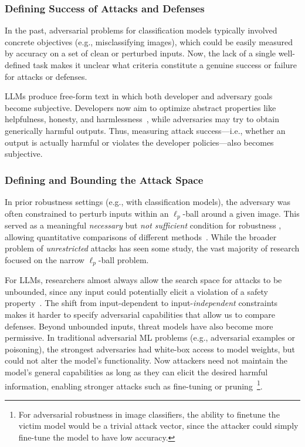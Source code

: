 \subsubsection{Defining Success of Attacks and Defenses}
\label{sssec:success}

In the past, adversarial problems for classification models typically involved concrete objectives (e.g., misclassifying images), which could be easily measured by accuracy on a set of clean or perturbed inputs. Now, the lack of a single well-defined task makes it unclear what criteria constitute a genuine success or failure for attacks or defenses.

LLMs produce free-form text in which both developer and adversary goals become subjective. Developers now aim to optimize abstract properties like helpfulness, honesty, and harmlessness~\citep{bai2022training}, while adversaries may try to obtain generically harmful outputs. Thus, measuring attack success---i.e., whether an output is actually harmful or violates the developer policies---also becomes subjective. %


\subsubsection{Defining and Bounding the Attack Space}
\label{sssec:attackspace}

In prior robustness settings (e.g., with classification models), the adversary was often constrained to perturb inputs within an $\ell_p$-ball around a given image. This served as a meaningful \emph{necessary} but \emph{not sufficient} condition for robustness  \cite{gilmer2018motivating}, allowing quantitative comparisons of different methods~\citep{goodfellow2014explaining}.
While the broader problem of \emph{unrestricted} \cite{brown2018unrestricted,song2018constructing} attacks has seen some study, the vast majority of research focused on the narrow $\ell_p$-ball problem.

For LLMs, researchers almost always allow the search space for attacks to be unbounded, since any input could potentially elicit a violation of a safety property~\citep{wei2024jailbroken}. The shift from input-dependent to input-\emph{independent} constraints makes it harder to specify adversarial capabilities that allow us to compare defenses. Beyond unbounded inputs, threat models have also become more permissive. In traditional adversarial ML problems (e.g., adversarial examples or poisoning), the strongest adversaries had white-box access to model weights, but could not alter the model's functionality. Now attackers need not maintain the model's general capabilities as long as they can elicit the desired harmful information, enabling stronger attacks such as fine-tuning or pruning~\citep{qi2024finetuning,wei2024assessing}\footnote{For adversarial robustness in image classifiers, the ability to finetune the victim model would be a trivial attack vector, since the attacker could simply fine-tune the model to have low accuracy.}.

